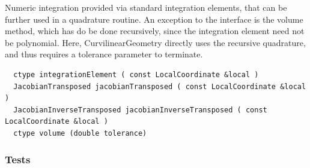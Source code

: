 \noindent
Numeric integration provided via standard integration elements, that can be further used in a quadrature routine. An exception to the interface is the volume method, which has do be done recursively, since the integration element need not be polynomial. Here, CurvilinearGeometry directly uses the recursive quadrature, and thus requires a tolerance parameter to terminate.

\begin{mybox}
\begin{lstlisting}
  ctype integrationElement ( const LocalCoordinate &local )
  JacobianTransposed jacobianTransposed ( const LocalCoordinate &local )
  JacobianInverseTransposed jacobianInverseTransposed ( const LocalCoordinate &local )
  ctype volume (double tolerance)
\end{lstlisting}
\end{mybox}







\subsubsection{Tests}

